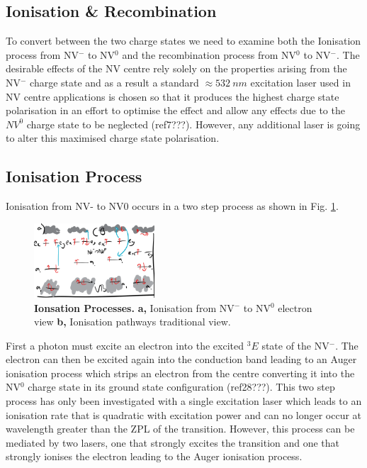 \documentclass[preprint,prl,twocolumn]{revtex4}
\begin{document}

\subsection{Ionisation \& Recombination}
To convert between the two charge states we need to examine both the Ionisation process from NV$^-$ to NV$^0$ and the recombination process from NV$^0$ to NV$^-$. The desirable effects of the NV centre rely solely on the properties arising from the NV$^-$ charge state and as a result a standard $\approx \SI{532}{nm}$ excitation laser used in NV centre applications is chosen so that it produces the highest charge state polarisation in an effort to optimise the effect and allow any effects due to the $NV^0$ charge state to be neglected (ref7???). However, any additional laser is going to alter this maximised charge state polarisation. 

\subsection{Ionisation Process}
Ionisation from NV- to NV0 occurs in a two step process as shown in Fig. \ref{FigChargeConversiona}.

\begin{figure}[H]
  \centering
  \includegraphics[width=0.4\textwidth]{ChargeConversiona.png} 
 \caption{\textbf{Ionsation Processes.} \textbf{a,} Ionisation from NV$^-$ to NV$^0$ electron view \textbf{b,} Ionisation pathways traditional view.} \label{FigChargeConversiona}
\end{figure}

First a photon must excite an electron into the excited $^3E$ state of the NV$^-$. The electron can then be excited again into the conduction band leading to an Auger ionisation process which strips an electron from the centre converting it into the NV$^0$ charge state in its ground state configuration (ref28???). This two step process has only been investigated with a single excitation laser which leads to an ionisation rate that is quadratic with excitation power and can no longer occur at wavelength greater than the ZPL of the transition. However, this process can be mediated by two lasers, one that strongly excites the transition and one that strongly ionises the electron leading to the Auger ionisation process.
\end{document}

